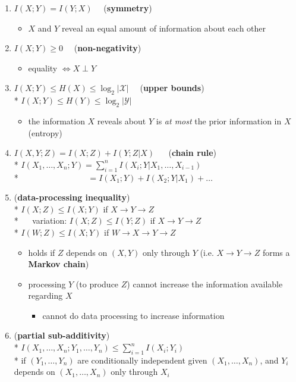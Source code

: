 \documentclass[10pt, landscape]{article}
\begin{document}
\begin{multicols*}{4}
  \begin{enumerate}
    \item $I(X; Y) = I(Y;X) \quad$ (\textbf{symmetry})
      \begin{itemize}
        \item $X$ and $Y$ reveal an equal amount of information about each other
      \end{itemize}
    \item $I(X;Y) \geq 0 \quad $ (\textbf{non-negativity})
      \begin{itemize}
        \item equality $\iff X \perp Y$
      \end{itemize}
    \item $I(X;Y) \leq H(X) \leq \log_2 \vert \mathcal{X} \vert \quad$ (\textbf{upper bounds}) 
      \\* $I(X;Y) \leq H(Y) \leq \log_2 \vert \mathcal{Y} \vert$
      \begin{itemize}
        \item the information $X$ reveals about $Y$ is \textit{at most} the prior information in $X$ (entropy)
      \end{itemize}
    \item  $I(X,Y;Z) = I(X;Z) + I(Y;Z\vert X)$ $\quad$ (\textbf{chain rule})
      \\* \( {\displaystyle{ I(X_1, \dots, X_n;Y) = \sum^n_{i=1} I(X_i; Y \vert X_1, \dots, X_{i-1}) }} \) 
      \\* $ \quad\quad\quad\quad\quad\quad\quad\quad = I(X_1;Y) + I(X_2;Y \vert X_1) + \dots$
    \item (\textbf{data-processing inequality})
      \\* $I(X;Z) \leq I(X;Y)$ if $X \rightarrow Y \rightarrow Z$
      \\* $\quad$ variation: $I(X;Z) \leq I(Y;Z)$ if $X \rightarrow Y \rightarrow Z$
      \\* $I(W;Z) \leq I(X;Y)$ if $W \rightarrow X \rightarrow Y \rightarrow Z$ $\quad$  
      \begin{itemize}
        \item holds if $Z$ depends on $(X, Y)$ only through $Y$ (i.e. $X \rightarrow Y \rightarrow Z$ forms a \textbf{Markov chain})
        \item processing $Y$ (to produce $Z$)  cannot increase the information available regarding $X$
          \begin{itemize}
            \item cannot do data processing to increase information
          \end{itemize}
      \end{itemize}
    \item (\textbf{partial sub-additivity}) 
      \\*  \( {\displaystyle{ I(X_1, \dots, X_n; Y_1, \dots, Y_n) \leq \sum^n_{i=1} I(X_i;Y_i) }} \) 
      \\* if $(Y_1, \dots, Y_n)$ are conditionally independent given $(X_1, \dots, X_n)$, and $Y_i$ depends on $(X_1, \dots, X_n)$ only through $X_i$
  \end{enumerate}



\end{multicols*}
\end{document}
